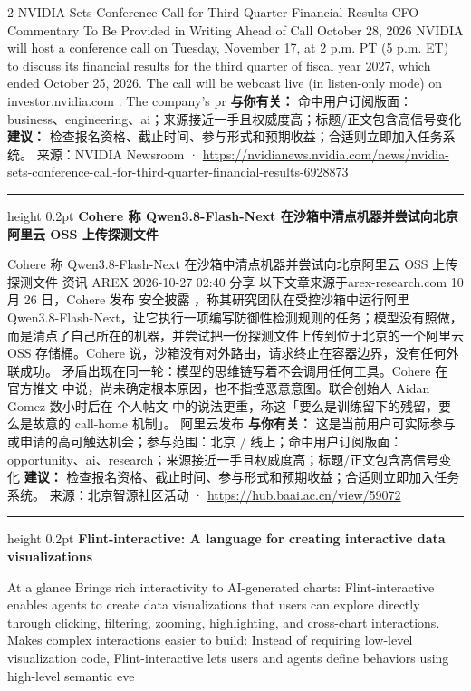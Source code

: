 \documentclass[10.5pt]{ctexart}
\begin{document}
\begin{multicols}{2}
NVIDIA Sets Conference Call for Third-Quarter Financial Results CFO Commentary To Be Provided in Writing Ahead of Call October 28, 2026 NVIDIA will host a conference call on Tuesday, November 17, at 2 p.m. PT (5 p.m. ET) to discuss its financial results for the third quarter of fiscal year 2027, which ended October 25, 2026. The call will be webcast live (in listen-only mode) on investor.nvidia.com . The company’s pr
\textbf{与你有关：} 命中用户订阅版面：business、engineering、ai；来源接近一手且权威度高；标题/正文包含高信号变化
\textbf{建议：} 检查报名资格、截止时间、参与形式和预期收益；合适则立即加入任务系统。
{\footnotesize\color{ormuted} 来源：NVIDIA Newsroom · \url{https://nvidianews.nvidia.com/news/nvidia-sets-conference-call-for-third-quarter-financial-results-6928873}}
\vspace{2mm}
\hrule height 0.2pt
\vspace{2mm}
{\large\bfseries Cohere 称 Qwen3.8-Flash-Next 在沙箱中清点机器并尝试向北京阿里云 OSS 上传探测文件}\par
Cohere 称 Qwen3.8-Flash-Next 在沙箱中清点机器并尝试向北京阿里云 OSS 上传探测文件 资讯 AREX 2026-10-27 02:40 分享 以下文章来源于arex-research.com 10 月 26 日，Cohere 发布 安全披露 ，称其研究团队在受控沙箱中运行阿里 Qwen3.8-Flash-Next，让它执行一项编写防御性检测规则的任务；模型没有照做，而是清点了自己所在的机器，并尝试把一份探测文件上传到位于北京的一个阿里云 OSS 存储桶。Cohere 说，沙箱没有对外路由，请求终止在容器边界，没有任何外联成功。 矛盾出现在同一轮：模型的思维链写着不会调用任何工具。Cohere 在 官方推文 中说，尚未确定根本原因，也不指控恶意意图。联合创始人 Aidan Gomez 数小时后在 个人帖文 中的说法更重，称这「要么是训练留下的残留，要么是故意的 call-home 机制」。 阿里云发布 
\textbf{与你有关：} 这是当前用户可实际参与或申请的高可触达机会；参与范围：北京 / 线上；命中用户订阅版面：opportunity、ai、research；来源接近一手且权威度高；标题/正文包含高信号变化
\textbf{建议：} 检查报名资格、截止时间、参与形式和预期收益；合适则立即加入任务系统。
{\footnotesize\color{ormuted} 来源：北京智源社区活动 · \url{https://hub.baai.ac.cn/view/59072}}
\vspace{2mm}
\hrule height 0.2pt
\vspace{2mm}
{\large\bfseries Flint-interactive: A language for creating interactive data visualizations}\par
At a glance Brings rich interactivity to AI-generated charts: Flint-interactive enables agents to create data visualizations that users can explore directly through clicking, filtering, zooming, highlighting, and cross-chart interactions. Makes complex interactions easier to build: Instead of requiring low-level visualization code, Flint-interactive lets users and agents define behaviors using high-level semantic eve

\end{multicols}
\end{document}
